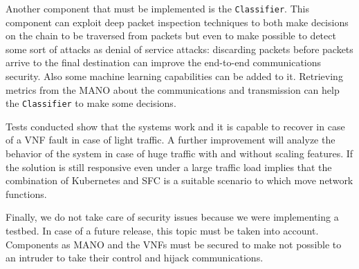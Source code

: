 Another component that must be implemented is the \texttt{Classifier}. This
component can exploit deep packet inspection techniques to both make decisions
on the chain to be traversed from packets but even to make possible to
detect some sort of attacks as denial of service attacks: discarding packets
before packets arrive to the final destination can improve the end-to-end
communications security. Also some machine learning capabilities can be added
to it. Retrieving metrics from the MANO about the communications and
transmission can help the \texttt{Classifier} to make some decisions.

Tests conducted show that the systems work and it is capable to recover in case
of a VNF fault in case of light traffic. A further improvement will analyze the
behavior of the system in case of huge traffic with and without scaling
features. If the solution is still responsive even under a large traffic load
implies that the combination of Kubernetes and SFC is a suitable scenario to
which move network functions.

Finally, we do not take care of security issues because we were implementing a
testbed. In case of a future release, this topic must be taken into account.
Components as MANO and the VNFs must be secured to make not possible to an
intruder to take their control and hijack communications. 